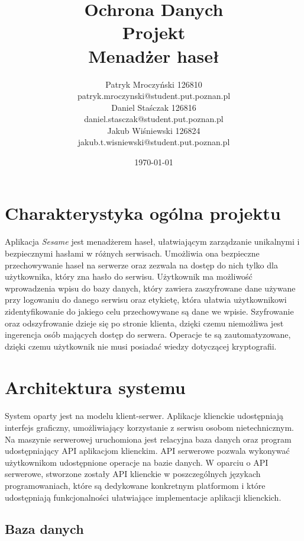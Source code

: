 \documentclass{article}
\title{
    Ochrona Danych
    \\
    [0.2em]\smaller{}
    Projekt
    \\
    Menadżer haseł \insertprojectname}
\author{
    Patryk Mroczyński 126810
    \\
    patryk.mroczynski@student.put.poznan.pl
    \\
    Daniel Staśczak 126816
    \\
    daniel.stasczak@student.put.poznan.pl
    \\
    Jakub Wiśniewski 126824
    \\
    jakub.t.wisniewski@student.put.poznan.pl
}
\date{\today}
\newcommand{\insertprojectname}{\textit{Sesame }}
\begin{document}
    \maketitle

    \newpage
    \tableofcontents
    \listoffigures
    \listoftables

    \newpage

    \section{Charakterystyka ogólna projektu}
    \paragraph{}Aplikacja \insertprojectname jest menadżerem haseł, ułatwiającym zarządzanie unikalnymi i bezpiecznymi hasłami w różnych serwisach. Umożliwia ona bezpieczne przechowywanie haseł na serwerze oraz zezwala na dostęp do nich tylko dla użytkownika, który zna hasło do serwisu. Użytkownik ma możliwość wprowadzenia wpisu do bazy danych, który zawiera zaszyfrowane dane używane przy logowaniu do danego serwisu oraz etykietę, która ułatwia użytkownikowi zidentyfikowanie do jakiego celu przechowywane są dane we wpisie. Szyfrowanie oraz odszyfrowanie dzieje się po stronie klienta, dzięki czemu niemożliwa jest ingerencja osób mających dostęp do serwera. Operacje te są zautomatyzowane, dzięki czemu użytkownik nie musi posiadać wiedzy dotyczącej kryptografii.

    \section{Architektura systemu}
    \paragraph{}System oparty jest na modelu klient-serwer. Aplikacje klienckie udostępniają interfejs graficzny, umożliwiający korzystanie z serwisu osobom nietechnicznym. Na maszynie serwerowej uruchomiona jest relacyjna baza danych oraz program udostępniający API aplikacjom klienckim. API serwerowe pozwala wykonywać użytkownikom udostępnione operacje na bazie danych. W oparciu o API serwerowe, stworzone zostały API klienckie w poszczególnych językach programowaniach, które są dedykowane konkretnym platformom i które udostępniają funkcjonalności ułatwiające implementacje aplikacji klienckich.

    \subsection{Baza danych}
\end{document}
